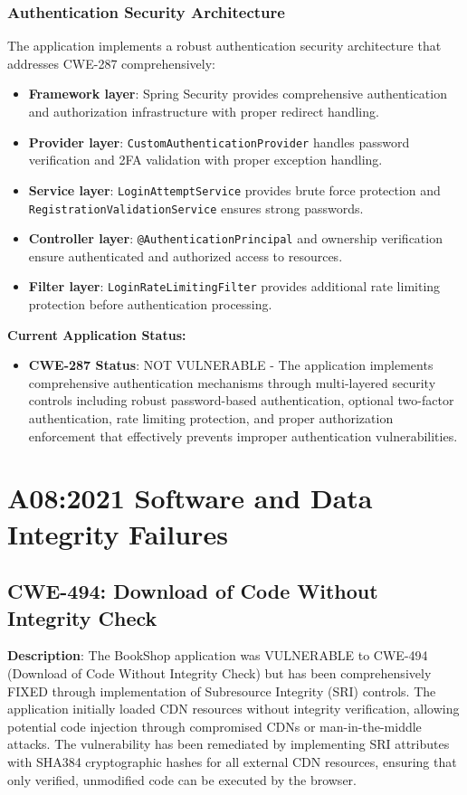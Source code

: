 \documentclass[]{UCD_CS_FYP_Report}
\begin{document}
\subsection{Authentication Security Architecture}
The application implements a robust authentication security architecture that addresses CWE-287 comprehensively:
\begin{itemize}
	\item \textbf{Framework layer}: Spring Security provides comprehensive authentication and authorization infrastructure with proper redirect handling.
	\item \textbf{Provider layer}: \texttt{CustomAuthenticationProvider} handles password verification and 2FA validation with proper exception handling.
	\item \textbf{Service layer}: \texttt{LoginAttemptService} provides brute force protection and \texttt{RegistrationValidationService} ensures strong passwords.
	\item \textbf{Controller layer}: \texttt{@AuthenticationPrincipal} and ownership verification ensure authenticated and authorized access to resources.
	\item \textbf{Filter layer}: \texttt{LoginRateLimitingFilter} provides additional rate limiting protection before authentication processing.
\end{itemize}

\textbf{Current Application Status:}
\begin{itemize}
	\item \textbf{CWE-287 Status}: NOT VULNERABLE - The application implements comprehensive authentication mechanisms through multi-layered security controls including robust password-based authentication, optional two-factor authentication, rate limiting protection, and proper authorization enforcement that effectively prevents improper authentication vulnerabilities.
\end{itemize}


\chapter{A08:2021 Software and Data Integrity Failures}

\section{CWE-494: Download of Code Without Integrity Check}

\textbf{Description}: The BookShop application was VULNERABLE to CWE-494 (Download of Code Without Integrity Check) but has been comprehensively FIXED through implementation of Subresource Integrity (SRI) controls. The application initially loaded CDN resources without integrity verification, allowing potential code injection through compromised CDNs or man-in-the-middle attacks. The vulnerability has been remediated by implementing SRI attributes with SHA384 cryptographic hashes for all external CDN resources, ensuring that only verified, unmodified code can be executed by the browser.
\end{document}
